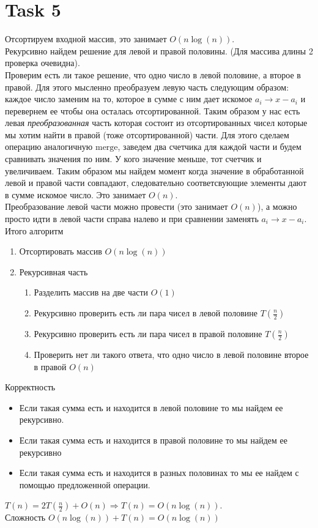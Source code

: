 \documentclass[12pt]{exam}
\begin{document}
\section*{Task 5}
Отсортируем входной массив, это занимает $O(n \log(n))$.\\
Рекурсивно найдем решение для левой и правой половины. (Для массива длины 2 проверка очевидна).\\
Проверим есть ли такое решение, что одно число в левой половине, а второе в правой. 
Для этого мысленно преобразуем левую часть следующим образом: 
каждое число заменим на то, которое в сумме с ним дает искомое $a_i \rightarrow x - a_i$ 
и перевернем ее чтобы она осталась отсортированной. 
Таким образом у нас есть левая \textit{преобразованная} часть которая состоит из отсортированных 
чисел которые мы хотим найти в правой (тоже отсортированной) части.
Для этого сделаем операцию аналогичную $\mathrm{merge}$, заведем два счетчика для каждой части 
и будем сравнивать значения по ним. У кого значение меньше, тот счетчик и увеличиваем. 
Таким образом мы найдем момент когда значение в $\textit{обработанной}$ левой и правой части 
совпадают, следовательно соответсвующие элементы дают в сумме искомое число. 
Это занимает $O(n)$.\\
Преобразование левой части можно провести (это занимает $O(n)$), 
а можно просто идти в левой части справа налево и при сравнении заменять $a_i \rightarrow x - a_i$. \\

Итого алгоритм 
\begin{enumerate}
    \item Отсортировать массив $O(n \log (n))$
    \item Рекурсивная часть
    \begin{enumerate}
        \item Разделить массив на две части $O(1)$
        \item Рекурсивно проверить есть ли пара чисел в левой половине $T(\frac{n}{2})$
        \item Рекурсивно проверить есть ли пара чисел в правой половине $T(\frac{n}{2})$
        \item Проверить нет ли такого ответа, что одно число в левой половине второе в правой $O(n)$
    \end{enumerate}
\end{enumerate}
Корректность 
\begin{itemize}
    \item Если такая сумма есть и находится в левой половине то мы найдем ее рекурсивно.
    \item Если такая сумма есть и находится в правой половине то мы найдем ее рекурсивно
    \item Если такая сумма есть и находится в разных половинах то мы ее найдем с помощью предложенной операции.
\end{itemize}
$T(n) = 2 T(\frac{n}{2}) + O(n) \Rightarrow T(n) = O(n \log (n))$. \\
Сложность $O(n \log (n)) + T(n) = O(n \log (n))$
\end{document}
